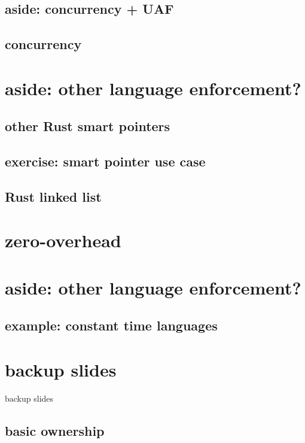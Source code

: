 \subsection{aside: concurrency + UAF}


\subsection{concurrency}


\section{aside: other language enforcement?}



\subsection{other Rust smart pointers}


\subsection{exercise: smart pointer use case}


\subsection{Rust linked list}


\section{zero-overhead}


\section{aside: other language enforcement?}


\subsection{example: constant time languages}




\section{backup slides}
\begin{frame}{backup slides}
\end{frame}
\subsection{basic ownership}



